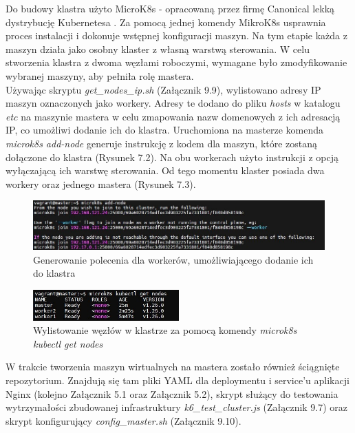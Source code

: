 Do budowy klastra użyto MicroK8s - opracowaną przez firmę Canonical lekką dystrybucję Kubernetesa \cite{microk8s}. Za pomocą jednej komendy MikroK8s usprawnia proces instalacji i dokonuje wstępnej konfiguracji maszyn. Na tym etapie każda z maszyn działa jako osobny klaster z własną warstwą sterowania. W celu stworzenia klastra z dwoma węzłami roboczymi, wymagane było zmodyfikowanie wybranej maszyny, aby pełniła rolę mastera. \\

Używając skryptu \textit{get\_nodes\_ip.sh} (Załącznik 9.9), wylistowano adresy IP maszyn oznaczonych jako workery. Adresy te dodano do pliku \textit{hosts} w katalogu \textit{etc} na maszynie mastera w celu zmapowania nazw domenowych z ich adresacją IP, co umożliwi dodanie ich do klastra. Uruchomiona na masterze komenda \textit{microk8s add-node} generuje instrukcję z kodem dla maszyn, które zostaną dołączone do klastra (Rysunek 7.2). Na obu workerach użyto instrukcji z opcją wyłączającą ich warstwę sterowania. Od tego momentu klaster posiada dwa workery oraz jednego mastera (Rysunek 7.3).

\begin{figure}[H]
    \centering
    \includegraphics[width=1\textwidth]{img2/addnode1.jpg}
    \caption{Generowanie polecenia dla workerów, umożliwiającego dodanie ich do klastra}
\end{figure}

\begin{figure}[H]
    \centering
    \includegraphics[width=0.5\textwidth]{img2/addnode3.jpg}
    \caption{Wylistowanie węzłów w klastrze za pomocą komendy \textit{microk8s kubectl get nodes}}
\end{figure}

 W trakcie tworzenia maszyn wirtualnych na mastera zostało również ściągnięte repozytorium. Znajdują się tam pliki YAML dla deploymentu i service'u aplikacji Nginx (kolejno Załącznik 5.1 oraz Załącznik 5.2), skrypt służący do testowania wytrzymałości zbudowanej infrastruktury \textit{k6\_test\_cluster.js} (Załącznik 9.7) oraz skrypt konfigurujący \textit{config\_master.sh} (Załącznik 9.10). \\

